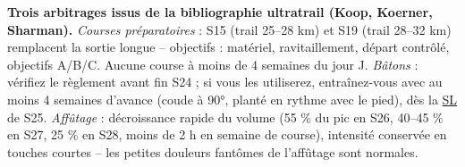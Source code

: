 \documentclass[10pt,a4paper]{article}
\newcommand{\sln}{\hyperlink{legende}{SL}}
\begin{document}
\begin{aret}
\textbf{Trois arbitrages issus de la bibliographie ultratrail (Koop, Koerner, Sharman).}
\emph{Courses pr\'eparatoires} : S15 (trail 25--28 km) et S19 (trail 28--32 km)
remplacent la sortie longue -- objectifs : mat\'eriel, ravitaillement, d\'epart
contr\^ol\'e, objectifs A/B/C. Aucune course \`a moins de 4 semaines du jour J.
\emph{B\^atons} : v\'erifiez le r\`eglement avant fin S24 ; si vous les utiliserez,
entra\^inez-vous avec au moins 4 semaines d'avance (coude \`a 90°, plant\'e en
rythme avec le pied), d\`es la \sln{} de S25. \emph{Aff\^utage} : d\'ecroissance
rapide du volume (55 \% du pic en S26, 40--45 \% en S27, 25 \% en S28, moins de
2 h en semaine de course), intensit\'e conserv\'ee en touches courtes -- les
petites douleurs fant\^omes de l'aff\^utage sont normales.
\end{aret}
\end{document}
